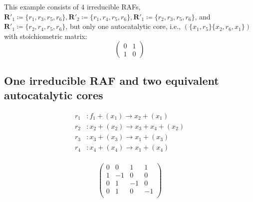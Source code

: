 \documentclass[pdflatex]{sn-jnl}
\theoremstyle{thmstyleone}%
\theoremstyle{examplesty}%
\theoremstyle{thmstylethree}%
\newcommand{\RAF}[0]{\mathbf{R}'}
\begin{document}
\FloatBarrier
%
This example consists of $4$ irreducible RAFs, $\RAF_1\coloneqq
\{r_1,r_3,r_5,r_6\}, \RAF_2\coloneqq \{r_1,r_4,r_5,r_6\}, \RAF_1\coloneqq
\{r_2,r_3,r_5,r_6\}$, and $\RAF_1\coloneqq \{r_2,r_4,r_5,r_6\}$, but only
one autocatalytic core, i.e., $(\{x_1,r_5\}\{x_2,r_6,x_1\})$ with
stoichiometric matrix:
\begin{equation}
  \begin{pmatrix}
    0 & 1\\
    1 & 0
  \end{pmatrix}
\end{equation}

\subsection{One irreducible RAF and two equivalent autocatalytic cores}
\label{subsec:IrrEquivCores}

\begin{minipage}[c]{0.5\textwidth}
\begin{equation}
  \begin{split}
    r_1&: f_1 + (x_1) \rightarrow x_2 + (x_1) \\ r_2&: x_2 +
    (x_2) \rightarrow x_3 + x_4 + (x_2) \\ r_3&: x_3 + (x_3)
    \rightarrow x_1 + (x_3) \\ r_4&: x_4 + (x_4) \rightarrow
    x_1 + (x_4) \\
  \end{split}
\end{equation}
\end{minipage}%
\hfill%
\begin{minipage}[c]{0.5\textwidth}
  \begin{equation}
    \begin{pmatrix}
      0 &  0 & 1 & 1 \\
      1 & -1 & 0 & 0 \\
      0 & 1 & -1 & 0 \\
      0 & 1 & 0 & -1 \\
    \end{pmatrix}
  \end{equation}
\end{minipage}%
\end{document}
